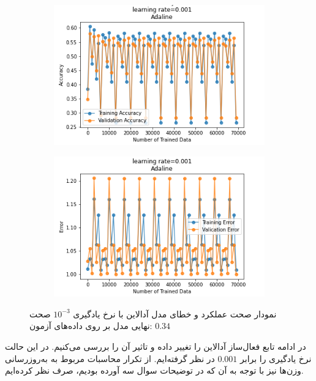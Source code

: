 \documentclass[12pt, a4paper]{article}
\begin{document}
\begin{figure}[h]
    \begin{subfigure}{0.45\linewidth}
        \centering
        \includegraphics[width=\linewidth]{images/5/adaline/lr/acc_0.001.png}
    \end{subfigure}
    \hfil
    \begin{subfigure}{0.45\linewidth}
        \centering
        \includegraphics[width=\linewidth]{images/5/adaline/lr/error_0.001.png}
    \end{subfigure}
    \caption{نمودار صحت عملکرد‌ و خطای مدل آدالاین با نرخ یادگیری $10^{-3}$
    \newline
    صحت نهایی مدل بر روی داده‌های آزمون: $0.34$}
\end{figure}

\clearpage

در ادامه تابع فعال‌ساز آدالاین را تغییر داده و تاثیر آن را بررسی می‌کنیم. در این حالت نرخ یادگیری را برابر
$0.001$ در نظر گرفته‌ایم. از تکرار محاسبات مربوط به به‌روزرسانی وزن‌ها نیز با توجه به آن که در توضیحات
سوال سه آورده بودیم، صرف نظر کرده‌ایم.
\end{document}
